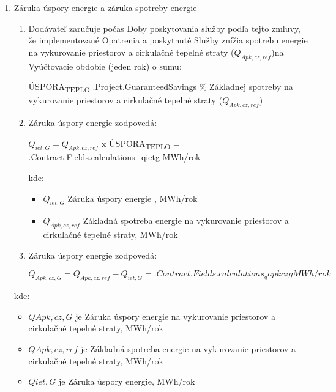 \begin{enumerate}

\begin{center}
\end{center}


\item Záruka úspory energie a záruka spotreby energie
\begin{enumerate}

\item Dodávateľ zaručuje počas Doby poskytovania služby podľa tejto zmluvy, že implementované Opatrenia a poskytnuté Služby znížia spotrebu energie na vykurovanie priestorov a cirkulačné tepelné straty ($Q_{Apk,cz,ref}$)na Vyúčtovacie obdobie (jeden rok) o sumu:

 ÚSPORA\textsubscript{TEPLO}  \iffalse input project.savings value="{{.Project.GuaranteedSavings}}" type="number" \fi {{.Project.GuaranteedSavings}}  \% Základnej spotreby na vykurovanie priestorov a cirkulačné tepelné straty ($Q_{Apk,cz,ref}$) 



\item Záruka úspory energie zodpovedá:

$Q_{iet,G} = Q_{Apk, cz, ref}$  x  ÚSPORA\textsubscript{TEPLO}   = {{.Contract.Fields.calculations_qietg}} MWh/rok



kde:
\begin{itemize}
	\item $Q_{iet,G}$	Záruka úspory energie , MWh/rok
	\item $Q_{Apk,cz,ref}$	Základná spotreba energie na vykurovanie priestorov a cirkulačné tepelné straty, MWh/rok
\end{itemize}

\item Záruka úspory energie zodpovedá:


\[Q_{Apk,cz,G} = Q_{Apk,cz,ref} - Q_{iet,G} = {{.Contract.Fields.calculations_qapkczg}} MWh/rok\]
\end{enumerate}
kde:

\begin{itemize}
	\item $QApk,cz,G$	je Záruka úspory energie na vykurovanie priestorov a cirkulačné tepelné straty, MWh/rok
	\item $QApk,cz,ref$	je Základná spotreba energie na vykurovanie priestorov a cirkulačné tepelné straty, MWh/rok
	\item $Qiet,G$	je  Záruka úspory energie, MWh/rok
\end{itemize}
\end{enumerate}
